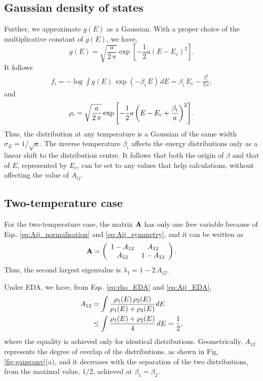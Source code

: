 \documentclass{gMOS2e}
\begin{document}
\subsection{Gaussian density of states}



Further, we approximate $g(E)$
as a Gaussian.
%
With a proper choice of the multiplicative constant of $g(E)$, we have,
%
\begin{equation}
g(E)
=
\sqrt{
  \frac{ a } { 2 \, \pi }
}
\exp\left[ -\frac 1 2 a (E - E_c)^2 \right].
\label{eq:gE_Gaussian}
\end{equation}
%
It follows
%
\begin{align}
f_i
=
-\log
\int
g(E) \, \exp(-\beta_i \, E) \, dE
=
\beta_i \, E_c - \frac{ \beta_i^2 }{ 2 \, a },
\label{eq:f_Gaussian}
\end{align}
%
and
\begin{align}
\rho_i
=
\sqrt{ \frac a { 2 \, \pi} }
\exp\left[
  -\frac 1 2
  a \left(
    E - E_c + \frac { \beta_i } { a }
  \right)^2
\right].
\notag
\end{align}
%
Thus,
the distribution at any temperature
is a Gaussian of the same width
$\sigma_E = 1/\sqrt{a}$.
%
The inverse temperature $\beta_i$
affects the energy distributions
only as a linear shift
to the distribution centre.
%
It follows that both the origin of $\beta$
and that of $E$, represented by $E_c$,
can be set to any values that help calculations,
without affecting the value of $A_{ij}$.



\subsection{Two-temperature case}



For the two-temperature case,
the matrix $\mathbf{A}$ has only one free variable
because of Eqs. \eqref{eq:Aij_normalisation}
and \eqref{eq:Aij_symmetry},
and it can be written as
%
\begin{align*}
\mathbf{A}
=
\left(
\begin{array}{ccc}
  1 - A_{12} & A_{12} \\
  A_{12}     & 1 - A_{12}
\end{array}
\right).
\end{align*}
%
Thus,
the second largest eigenvalue is
$\lambda_1 = 1 - 2 \, A_{12}$.



Under EDA,
we have, from
Eqs. \eqref{eq:rho_EDA} and \eqref{eq:Aij_EDA},
%
\begin{align}
A_{12}
&=
\int
\frac{ \rho_1(E) \, \rho_2(E) }
{ \rho_1(E) + \rho_2(E) }
dE
\notag \\
&\le
\int
\frac{ \rho_1(E) + \rho_2(E) }
{ 4 }
\, dE
= \frac 1 2,
\notag
\end{align}
where
the equality is achieved
only for identical distributions.
%
Geometrically,
$A_{12}$
represents the degree of overlap
of the distributions,
as shown in Fig. \ref{fig:gausconv}(a),
%
and it decreases
with the separation
of the two distributions,
from the maximal value, $1/2$,
achieved at $\beta_1 = \beta_2$.
\end{document}
